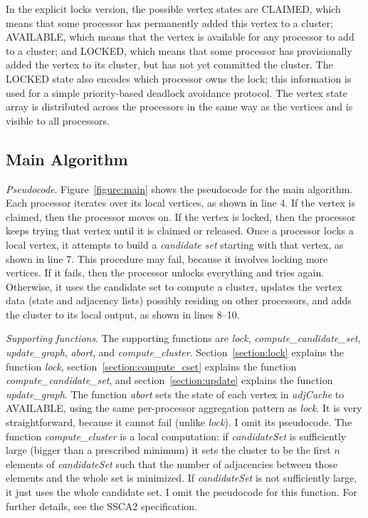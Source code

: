 \documentclass[10pt]{article}
\begin{document}
\begin{sloppypar}
In the explicit locks version, the possible vertex states are CLAIMED,
which means that some processor has permanently added this vertex to a
cluster; AVAILABLE, which means that the vertex is available for any
processor to add to a cluster; and LOCKED, which means that some
processor has provisionally added the vertex to its cluster, but has
not yet committed the cluster.  The LOCKED state also encodes which
processor owns the lock; this information is used for a simple
priority-based deadlock avoidance protocol.  The vertex state array is
distributed across the processors in the same way as the vertices and
is visible to all processors.

\subsection{Main Algorithm}

\emph{Pseudocode}.  Figure~\ref{figure:main} shows the pseudocode for
the main algorithm.  Each processor iterates over its local vertices,
as shown in line 4.  If the vertex is claimed, then the processor
moves on.  If the vertex is locked, then the processor keeps trying
that vertex until it is claimed or released.  Once a processor locks a
local vertex, it attempts to build a \emph{candidate set} starting
with that vertex, as shown in line 7.  This procedure may fail,
because it involves locking more vertices.  If it fails, then the
processor unlocks everything and tries again.  Otherwise, it uses the
candidate set to compute a cluster, updates the vertex data (state and
adjacency lists) possibly residing on other processors, and adds the
cluster to its local output, as shown in lines 8--10.

\emph{Supporting functions}.  The supporting functions are
\emph{lock}, \emph{compute\_candidate\_set}, \emph{update\_graph},
\emph{abort}, and \emph{compute\_cluster}.  Section~\ref{section:lock}
explains the function \emph{lock}, section~\ref{section:compute_cset}
explains the function \emph{compute\_candidate\_set}, and
section~\ref{section:update} explains the function \emph{update\_graph}.  The
function \emph{abort} sets the state of each vertex in \emph{adjCache}
to AVAILABLE, using the same per-processor aggregation pattern as
\emph{lock}.  It is very straightforward, because it cannot fail
(unlike \emph{lock}).  I omit its pseudocode.  The function
\emph{compute\_cluster} is a local computation: if \emph{candidateSet}
is sufficiently large (bigger than a prescribed minimum) it sets the
cluster to be the first $n$ elements of \emph{candidateSet} such that
the number of adjacencies between those elements and the whole set is
minimized.  If \emph{candidateSet} is not sufficiently large, it just
uses the whole candidate set.  I omit the pseudocode for this
function.  For further details, see the SSCA2 specification.


\end{sloppypar}
\end{document}
